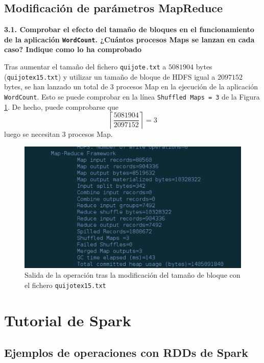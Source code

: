 \documentclass[10pt,swedish, openany]{book}
\begin{document}
 

\section{Modificación de parámetros MapReduce}

\textbf{3.1. Comprobar el efecto del tamaño de bloques en el funcionamiento de la aplicación \texttt{WordCount}. ¿Cuántos procesos Maps se lanzan en cada caso? Indique como lo ha comprobado}

Tras aumentar el tamaño del fichero \texttt{quijote.txt} a $5081904$ bytes (\texttt{quijotex15.txt}) y utilizar un tamaño de bloque de HDFS igual a $2097152$ bytes, se han lanzado un total de 3 procesos Map en la ejecución de la aplicación \texttt{WordCount}. Esto se puede comprobar en la línea \texttt{Shuffled Maps = 3} de la Figura \ref{fig:my_label}. De hecho, puede comprobarse que
\begin{equation*}
    \left\lceil\dfrac{5081904}{2097152}\right\rceil = 3
\end{equation*}
luego se necesitan 3 procesos Map. 

\begin{figure}[h]
    \caption{Salida de la operación tras la modificación del tamaño de bloque con el fichero \texttt{quijotex15.txt}}
    \label{fig:my_label}
    \centering
    \includegraphics[width=1\textwidth]{images/salidamapreduce.png}
\end{figure}


\chapter{Tutorial de Spark}

\section{Ejemplos de operaciones con RDDs de Spark}
\end{document}
